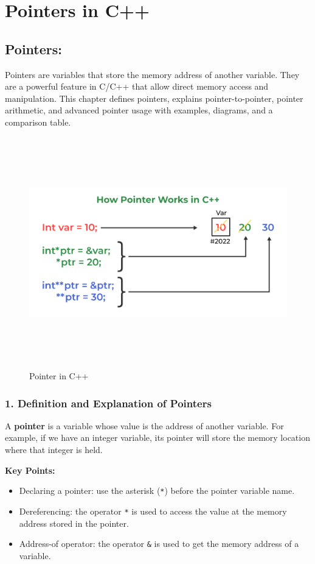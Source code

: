 \chapter{Pointers in C++}

\section*{\Large \textbf{Pointers:}}
Pointers are variables that store the memory address of another variable. They are a powerful feature in C/C++ that allow direct memory access and manipulation. This chapter defines pointers, explains pointer-to-pointer, pointer arithmetic, and advanced pointer usage with examples, diagrams, and a comparison table.

\begin{figure}[h!]
  \centering
  \includegraphics[width=1\textwidth, height=10cm]{images/pointers.png}
  \caption{Pointer in C++}
  \label{fig:pointer_overview}
\end{figure}

\subsection*{\large \textbf{1. Definition and Explanation of Pointers}}

A \textbf{pointer} is a variable whose value is the address of another variable. For example, if we have an integer variable, its pointer will store the memory location where that integer is held.

\textbf{Key Points:}
\begin{itemize}[leftmargin=2em]
  \item Declaring a pointer: use the asterisk (\texttt{*}) before the pointer variable name.
  \item Dereferencing: the operator \texttt{*} is used to access the value at the memory address stored in the pointer.
  \item Address-of operator: the operator \texttt{\&} is used to get the memory address of a variable.
\end{itemize}

